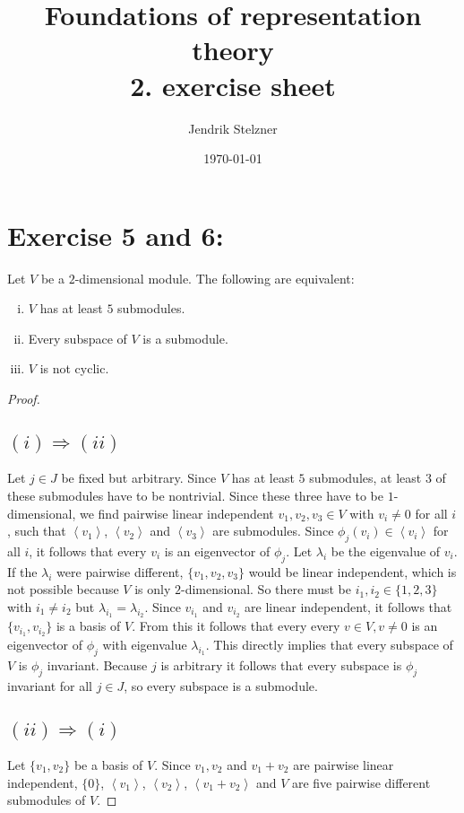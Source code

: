 \documentclass[a4paper,10pt]{article}
\title{Foundations of representation theory \\ 2. exercise sheet}
\author{Jendrik Stelzner}
\date{\today}
\newcommand{\gen}[1]{\left\langle#1\right\rangle}
\begin{document}
\maketitle

\section*{Exercise 5 and 6:}
Let $V$ be a $2$-dimensional module. The following are equivalent:
\begin{enumerate}[(i)]
 \item $V$ has at least $5$ submodules.
 \item Every subspace of $V$ is a submodule.
 \item $V$ is not cyclic.
\end{enumerate}

\begin{proof}
\subsection*{$(i) \Rightarrow (ii)$}\addtocounter{section}{2}
Let $j \in J$ be fixed but arbitrary.
Since $V$ has at least $5$ submodules, at least $3$ of these submodules have to be nontrivial. Since these three have to be $1$-dimensional, we find pairwise linear independent $v_1, v_2, v_3 \in V$ with $v_i \neq 0$ for all $i$, such that $\gen{v_1}$, $\gen{v_2}$ and $\gen{v_3}$ are submodules. Since $\phi_j(v_i) \in \gen{v_i}$ for all $i$, it follows that every $v_i$ is an eigenvector of $\phi_j$. Let $\lambda_i$ be the eigenvalue of $v_i$. If the $\lambda_i$ were pairwise different, $\{v_1, v_2, v_3\}$ would be linear independent, which is not possible because $V$ is only $2$-dimensional. So there must be $i_1, i_2 \in \{1,2,3\}$ with $i_1 \neq i_2$ but $\lambda_{i_1} = \lambda_{i_2}$. Since $v_{i_1}$ and $v_{i_2}$ are linear independent, it follows that $\{v_{i_1}, v_{i_{2}}\}$ is a basis of $V$. From this it follows that every every $v \in V, v \neq 0$ is an eigenvector of $\phi_j$ with eigenvalue $\lambda_{i_1}$. This directly implies that every subspace of $V$ is $\phi_j$ invariant. Because $j$ is arbitrary it follows that every subspace is $\phi_j$ invariant for all $j \in J$, so every subspace is a submodule.

\subsection*{$(ii) \Rightarrow (i)$}
Let $\{v_1, v_2\}$ be a basis of $V$. Since $v_1, v_2$ and $v_1+v_2$ are pairwise linear independent, $\{0\}$, $\gen{v_1}$, $\gen{v_2}$, $\gen{v_1+v_2}$ and $V$ are five pairwise different submodules of $V$.


\end{proof}
\end{document}
